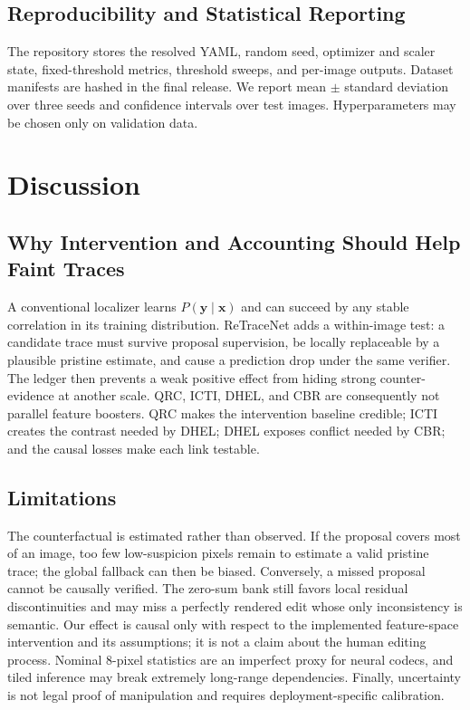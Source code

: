 \documentclass[journal]{IEEEtran}
\newcommand{\method}{ReTraceNet}
\begin{document}
\subsection{Reproducibility and Statistical Reporting}
The repository stores the resolved YAML, random seed, optimizer and scaler state,
fixed-threshold metrics, threshold sweeps, and per-image outputs.  Dataset manifests
are hashed in the final release.  We report mean $\pm$ standard deviation over
three seeds and confidence intervals over test images.  Hyperparameters may be
chosen only on validation data.

\section{Discussion}
\subsection{Why Intervention and Accounting Should Help Faint Traces}
A conventional localizer learns $P(\mathbf y\mid\mathbf x)$ and can succeed by any
stable correlation in its training distribution. \method{} adds a within-image
test: a candidate trace must survive proposal supervision, be locally replaceable
by a plausible pristine estimate, and cause a prediction drop under the same
verifier. The ledger then prevents a weak positive effect from hiding strong
counter-evidence at another scale. QRC, ICTI, DHEL, and CBR are consequently not
parallel feature boosters. QRC makes the intervention baseline credible; ICTI
creates the contrast needed by DHEL; DHEL exposes conflict needed by CBR; and the
causal losses make each link testable.

\subsection{Limitations}
The counterfactual is estimated rather than observed. If the proposal covers most
of an image, too few low-suspicion pixels remain to estimate a valid pristine
trace; the global fallback can then be biased. Conversely, a missed proposal
cannot be causally verified. The zero-sum bank still favors local residual
discontinuities and may miss a perfectly rendered edit whose only inconsistency is
semantic. Our effect is causal only with respect to the implemented feature-space
intervention and its assumptions; it is not a claim about the human editing
process. Nominal 8-pixel statistics are an imperfect proxy for neural codecs, and
tiled inference may break extremely long-range dependencies. Finally, uncertainty
is not legal proof of manipulation and requires deployment-specific calibration.
\end{document}
